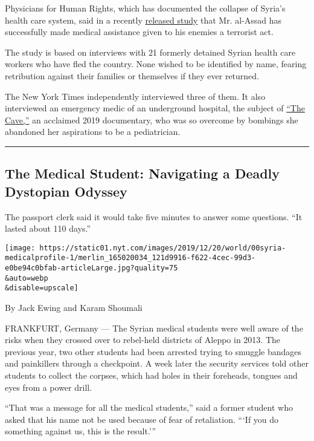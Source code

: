 Physicians for Human Rights, which has documented the collapse of
Syria's health care system, said in a recently
\href{https://phr.org/our-work/resources/my-only-crime-was-that-i-was-a-doctor/}{released
study} that Mr. al-Assad has successfully made medical assistance given
to his enemies a terrorist act.

The study is based on interviews with 21 formerly detained Syrian health
care workers who have fled the country. None wished to be identified by
name, fearing retribution against their families or themselves if they
ever returned.

The New York Times independently interviewed three of them. It also
interviewed an emergency medic of an underground hospital, the subject
of \href{https://www.nationalgeographic.com/films/the-cave/\#/}{``The
Cave,''} an acclaimed 2019 documentary, who was so overcome by bombings
she abandoned her aspirations to be a pediatrician.

\begin{center}\rule{0.5\linewidth}{\linethickness}\end{center}

\hypertarget{the-medical-student-navigating-a-deadly-dystopian-odyssey}{%
\subsection{The Medical Student: Navigating a Deadly Dystopian
Odyssey}\label{the-medical-student-navigating-a-deadly-dystopian-odyssey}}

The passport clerk said it would take five minutes to answer some
questions. ``It lasted about 110 days.''

\texttt{[image: https://static01.nyt.com/images/2019/12/20/world/00syria-medicalprofile-1/merlin\_165020034\_121d9916-f622-4cec-99d3-e0be94c0bfab-articleLarge.jpg?quality=75\\\&auto=webp\\\&disable=upscale]}

By Jack Ewing and Karam Shoumali

FRANKFURT, Germany --- The Syrian medical students were well aware of
the risks when they crossed over to rebel-held districts of Aleppo in
2013. The previous year, two other students had been arrested trying to
smuggle bandages and painkillers through a checkpoint. A week later the
security services told other students to collect the corpses, which had
holes in their foreheads, tongues and eyes from a power drill.

``That was a message for all the medical students,'' said a former
student who asked that his name not be used because of fear of
retaliation. ```If you do something against us, this is the result.'''

